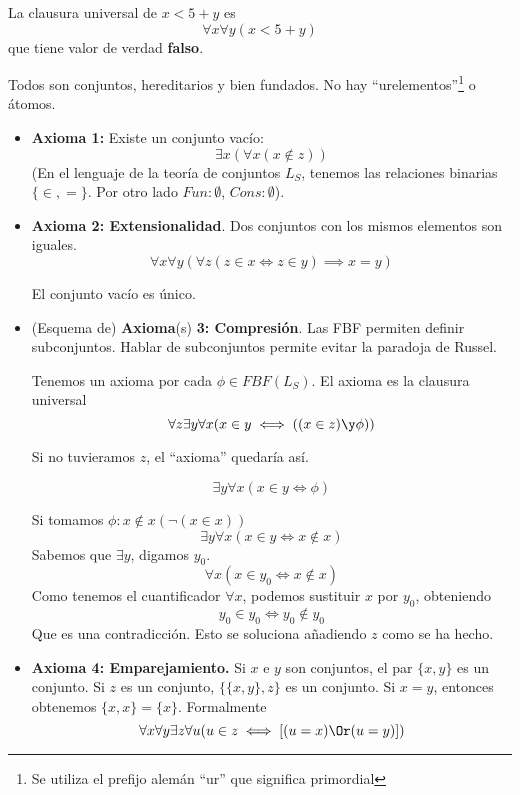\begin{example}
	La clausura universal de $x < 5 + y$ es $$\forall x\forall y (x < 5 + y)$$ que tiene valor de verdad \textbf{falso}.
\end{example}

\begin{example}
	Todos son conjuntos, hereditarios y bien fundados.
	No hay ``urelementos''\footnote{Se utiliza el prefijo alemán ``ur'' que significa primordial} o átomos.
	\begin{itemize}
		\item \textbf{Axioma 1:} Existe un conjunto vacío:
		$$\exists x (\forall x (x\notin z))$$
		(En el lenguaje de la teoría de conjuntos $L_S$, tenemos las relaciones binarias $\{\in, =\}$. Por otro lado $Fun: \emptyset$, $Cons: \emptyset$).
		\item \textbf{Axioma 2: Extensionalidad}.
		Dos conjuntos con los mismos elementos son iguales.
		$$\forall x\forall y(\forall z (z\in x\iff z\in y)\implies x = y)$$
		\begin{corol}
			El conjunto vacío es único.
		\end{corol}
		
		\item (Esquema de) \textbf{Axioma}(s) \textbf{3: Compresión}. Las FBF permiten definir subconjuntos. Hablar de subconjuntos permite evitar la paradoja de Russel.
		
		Tenemos un axioma por cada $\phi\in FBF(L_S)$. El axioma es la clausura universal
		$$\forall z \exists y \forall x(x\in y\iff((x\in z)\y \phi))$$
		
		Si no tuvieramos $z$, el ``axioma'' quedaría así.
		
		$$\exists y \forall x (x\in y\iff \phi)$$
		
		Si tomamos $\phi: x\notin x (\neg (x\in x))$
		$$\exists y \forall x (x\in y\iff x\notin x)$$
		Sabemos que $\exists y$, digamos $y_0$.
		$$\forall x (x\in y_0 \iff x\notin x)$$ 
		Como tenemos el cuantificador $\forall x$, podemos sustituir $x$ por $y_0$, obteniendo
		$$y_0\in y_0 \iff y_0\notin y_0$$
		Que es una contradicción. Esto se soluciona añadiendo $z$ como se ha hecho.
		
		\item \textbf{Axioma 4: Emparejamiento.} Si $x$ e $y$ son conjuntos, el par $\{x, y\}$ es un conjunto. Si $z$ es un conjunto, $\{\{x,y\},z\}$ es un conjunto. Si $x = y$, entonces obtenemos $\{x,x\} = \{x\}$. Formalmente
		$$\forall x\forall y\exists z\forall u(u\in z\iff \left[(u=x)\Or (u=y)\right])$$
	\end{itemize}
	
	
\end{example}

